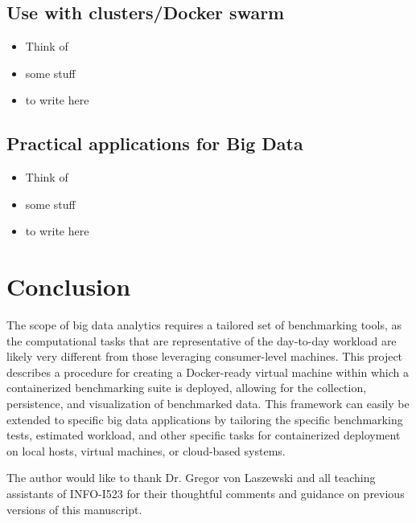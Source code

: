 \documentclass[sigconf]{acmart}
\begin{document}
\subsection{Use with clusters/Docker swarm}

\begin{itemize}
  \item Think of
  \item some stuff
  \item to write here
\end{itemize}

\subsection{Practical applications for Big Data}

\begin{itemize}
  \item Think of
  \item some stuff
  \item to write here
\end{itemize}

\section{Conclusion}
The scope of big data analytics requires a tailored set of benchmarking tools, as the computational tasks that are representative of the day-to-day workload are likely very different from those leveraging consumer-level machines. This project describes a procedure for creating a Docker-ready virtual machine within which a containerized benchmarking suite is deployed, allowing for the collection, persistence, and visualization of benchmarked data. This framework can easily be extended to specific big data applications by tailoring the specific benchmarking tests, estimated workload, and other specific tasks for containerized deployment on local hosts, virtual machines, or cloud-based systems.

\begin{acks}

The author would like to thank Dr. Gregor von Laszewski and all teaching assistants of INFO-I523 for their thoughtful comments and guidance on previous versions of this manuscript.

\end{acks}


 
\end{document}
